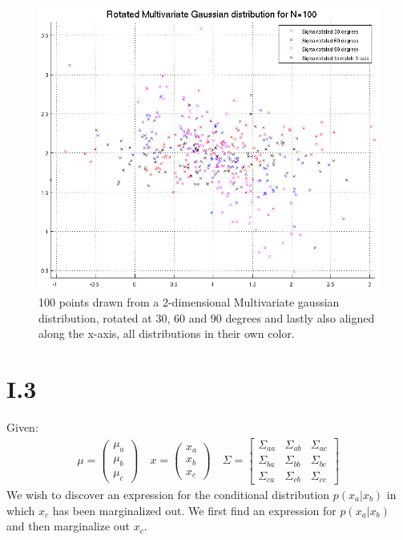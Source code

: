 \begin{figure}[h!]
	\includegraphics[width=\textwidth]{img/multigaussrotate}
	\caption{100 points drawn from a 2-dimensional Multivariate gaussian
          distribution, rotated at 30, 60 and 90 degrees and lastly also aligned
          along the x-axis, all distributions in their own
          color. \label{fig:I.2.4.1.rot}}
\end{figure}

\section*{I.3}
Given:
\begin{align*}
	\mu = \begin{pmatrix}
		\mu_a \\
		\mu_b \\
		\mu_c
	\end{pmatrix} \quad
	x = \begin{pmatrix}
		x_a \\
		x_b \\
		x_c
	\end{pmatrix} \quad
	\Sigma = \begin{bmatrix}
		\Sigma_{aa} & \Sigma_{ab} & \Sigma_{ac} \\
		\Sigma_{ba} & \Sigma_{bb} & \Sigma_{bc} \\
		\Sigma_{ca} & \Sigma_{cb} & \Sigma_{cc}
	\end{bmatrix}
\end{align*}
We wish to discover an expression for the conditional distribution $p(x_a|x_b)$
in which $x_c$ has been marginalized out. We first find an expression for
$p(x_a|x_b)$ and then marginalize out $x_c$.

